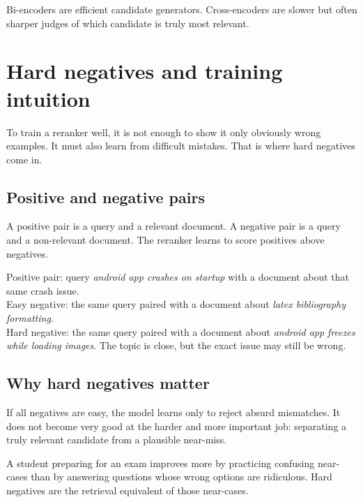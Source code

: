 \documentclass[11pt,oneside]{report}
\begin{document}
\begin{rememberbox}
Bi-encoders are efficient candidate generators. Cross-encoders are slower but often sharper judges of which candidate is truly most relevant.
\end{rememberbox}


\chapter[Hard Negatives and Training]{Hard negatives and training intuition}

\begin{purposebox}
To train a reranker well, it is not enough to show it only obviously wrong examples. It must also learn from difficult mistakes. That is where hard negatives come in.
\end{purposebox}

\section*{Positive and negative pairs}
A positive pair is a query and a relevant document. A negative pair is a query and a non-relevant document. The reranker learns to score positives above negatives.

\begin{examplebox}
Positive pair: query \emph{android app crashes on startup} with a document about that same crash issue.\\
Easy negative: the same query paired with a document about \emph{latex bibliography formatting}.\\
Hard negative: the same query paired with a document about \emph{android app freezes while loading images}. The topic is close, but the exact issue may still be wrong.
\end{examplebox}

\section*{Why hard negatives matter}
If all negatives are easy, the model learns only to reject absurd mismatches. It does not become very good at the harder and more important job: separating a truly relevant candidate from a plausible near-miss.

\begin{intuitionbox}
A student preparing for an exam improves more by practicing confusing near-cases than by answering questions whose wrong options are ridiculous. Hard negatives are the retrieval equivalent of those near-cases.
\end{intuitionbox}
\end{document}
